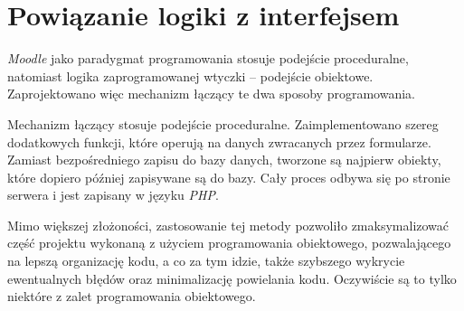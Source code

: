\section{Powiązanie logiki z interfejsem}
\label{Chapter67}

\textit{Moodle} jako paradygmat programowania stosuje podejście proceduralne, natomiast logika zaprogramowanej wtyczki -- podejście obiektowe. Zaprojektowano więc mechanizm łączący te dwa sposoby programowania.

Mechanizm łączący stosuje podejście proceduralne. Zaimplementowano szereg dodatkowych funkcji, które operują na danych zwracanych przez formularze. Zamiast bezpośredniego zapisu do bazy danych, tworzone są najpierw obiekty, które dopiero później zapisywane są do bazy. Cały proces odbywa się po stronie serwera i jest zapisany w języku \textit{PHP}. 

Mimo większej złożoności, zastosowanie tej metody pozwoliło zmaksymalizować część projektu wykonaną z użyciem programowania obiektowego, pozwalającego na lepszą organizację kodu, a co za tym idzie, także szybszego wykrycie ewentualnych błędów oraz minimalizację powielania kodu. Oczywiście są to tylko niektóre z zalet programowania obiektowego.